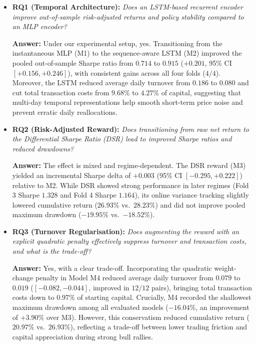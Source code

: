\begin{itemize}
    \setlength{\itemsep}{2pt}
    \setlength{\parskip}{1pt}
    \item \textbf{RQ1 (Temporal Architecture):} \textit{Does an LSTM-based recurrent encoder improve out-of-sample risk-adjusted returns and policy stability compared to an MLP encoder?}
    
    \textbf{Answer:} Under our experimental setup, yes. Transitioning from the instantaneous MLP (M1) to the sequence-aware LSTM (M2) improved the pooled out-of-sample Sharpe ratio from $0.714$ to $0.915$ ($+0.201$, 95\% CI $[+0.156, +0.246]$), with consistent gains across all four folds ($4/4$). Moreover, the LSTM reduced average daily turnover from $0.186$ to $0.080$ and cut total transaction costs from $9.68\%$ to $4.27\%$ of capital, suggesting that multi-day temporal representations help smooth short-term price noise and prevent erratic daily reallocations.

    \item \textbf{RQ2 (Risk-Adjusted Reward):} \textit{Does transitioning from raw net return to the Differential Sharpe Ratio (DSR) lead to improved Sharpe ratios and reduced drawdowns?}
    
    \textbf{Answer:} The effect is mixed and regime-dependent. The DSR reward (M3) yielded an incremental Sharpe delta of $+0.003$ (95\% CI $[-0.295, +0.222]$) relative to M2. While DSR showed strong performance in later regimes (Fold 3 Sharpe $1.328$ and Fold 4 Sharpe $1.164$), its online variance tracking slightly lowered cumulative return ($26.93\%$ vs.\ $28.23\%$) and did not improve pooled maximum drawdown ($-19.95\%$ vs.\ $-18.52\%$).

    \item \textbf{RQ3 (Turnover Regularisation):} \textit{Does augmenting the reward with an explicit quadratic penalty effectively suppress turnover and transaction costs, and what is the trade-off?}
    
    \textbf{Answer:} Yes, with a clear trade-off. Incorporating the quadratic weight-change penalty in Model M4 reduced average daily turnover from $0.079$ to $0.019$ ($[-0.082, -0.044]$, improved in $12/12$ pairs), bringing total transaction costs down to $0.97\%$ of starting capital. Crucially, M4 recorded the shallowest maximum drawdown among all evaluated models ($-16.04\%$, an improvement of $+3.90\%$ over M3). However, this conservatism reduced cumulative return ($20.97\%$ vs.\ $26.93\%$), reflecting a trade-off between lower trading friction and capital appreciation during strong bull rallies.


\end{itemize}
